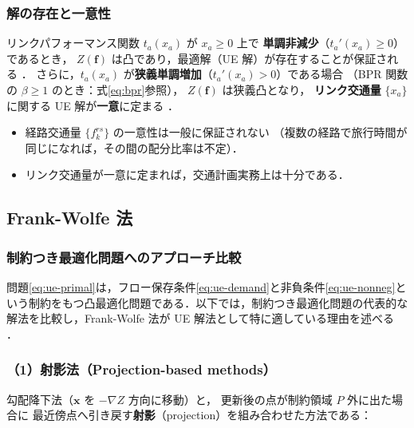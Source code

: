 \subsubsection*{解の存在と一意性}

リンクパフォーマンス関数 $t_a(x_a)$ が $x_a \geq 0$ 上で
\textbf{単調非減少}（$t_a'(x_a) \geq 0$）であるとき，
$Z(\boldsymbol{f})$ は凸であり，最適解（UE 解）が存在することが保証される
\cite{Beckmann1956,土木学会1998}．
さらに，$t_a(x_a)$ が\textbf{狭義単調増加}（$t_a'(x_a)>0$）である場合
（BPR 関数の $\beta \geq 1$ のとき：式\eqref{eq:bpr}参照），
$Z(\boldsymbol{f})$ は狭義凸となり，
\textbf{リンク交通量} $\{x_a\}$ に関する UE 解が\textbf{一意}に定まる
\cite{Sheffi1985}．

\begin{itemize}
  \item 経路交通量 $\{f_k^{rs}\}$ の一意性は一般に保証されない
        （複数の経路で旅行時間が同じになれば，その間の配分比率は不定）．
  \item リンク交通量が一意に定まれば，交通計画実務上は十分である．
\end{itemize}

\subsection{Frank-Wolfe 法}
\label{subsec:frank-wolfe}

\subsubsection{制約つき最適化問題へのアプローチ比較}
\label{subsubsec:fw-comparison}

問題\eqref{eq:ue-primal}は，フロー保存条件\eqref{eq:ue-demand}と非負条件\eqref{eq:ue-nonneg}という制約をもつ凸最適化問題である．以下では，制約つき最適化問題の代表的な解法を比較し，Frank-Wolfe 法が UE 解法として特に適している理由を述べる
\cite{Pokutta2024}．

\subsubsection*{（1）射影法（Projection-based methods）}

勾配降下法（$\boldsymbol{x}$ を $-\nabla Z$ 方向に移動）と，
更新後の点が制約領域 $P$ 外に出た場合に
最近傍点へ引き戻す\textbf{射影}（projection）を組み合わせた方法である：

